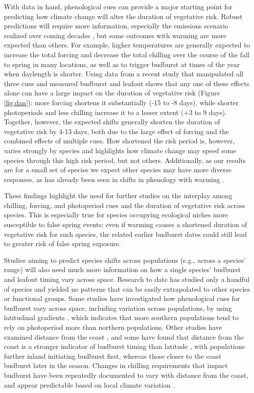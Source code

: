 \documentclass{article}\usepackage[]{graphicx}\usepackage[]{color}
\begin{document}
With data in hand, phenological cues can provide a major starting point for predicting how climate change will alter the duration of vegetative risk. Robust predictions will require more information, especially the emissions scenario realized over coming decades \citep{IPCC2014}, but some outcomes with warming are more expected than others. For example, higher temperatures are generally expected to increase the total forcing and decrease the total chilling over the course of the fall to spring in many locations, as well as to trigger budburst at times of the year when daylength is shorter. Using data from a recent study that manipulated all three cues and measured budburst and leafout \citep{Flynn2018} shows that any one of these effects alone can have a large impact on the duration of vegetative risk (Figure \ref{fig:dan}): more forcing shortens it substantially (-15 to -8 days), while shorter photoperiods and less chilling increase it to a lesser extent (+3 to 9 days). Together, however, the expected shifts generally shorten the duration of vegetative risk by 4-13 days, both due to the large effect of forcing and the combined effects of multiple cues. How shortened the risk period is, however, varies strongly by species and highlights how climate change may speed some species through this high risk period, but not others. Additionally, as our results are for a small set of species we expect other species may have more diverse responses, as has already been seen in shifts in phenology with warming \citep{Cleland2006, Fu2015, Xin2016}.

These findings highlight the need for further studies on the interplay among chilling, forcing, and photoperiod cues and the duration of vegetative risk across species. This is especially true for species occupying ecological niches more susceptible to false spring events; even if warming causes a shortened duration of vegetative risk for such species, the related earlier budburst dates could still lead to greater risk of false spring exposure.

Studies aiming to predict species shifts across populations (e.g., across a species' range) will also need much more information on how a single species' budburst and leafout timing vary across space. Research to date has studied only a handful of species and yielded no patterns that can be easily extrapolated to other species or functional groups. Some studies have investigated how phenological cues for budburst vary across space, including variation across populations, by using latitudinal gradients \citep{Gauzere2017, Sogaard2008, Way2015, Zohner2016}, which indicates that more southern populations tend to rely on photoperiod more than northern populations. Other studies have examined distance from the coast \citep[see][]{Aitken2015, Harrington2015, Myking2007}, and some have found that distance from the coast is a stronger indicator of budburst timing than latitude \citep{Myking2007}, with populations further inland initiating budburst first, whereas those closer to the coast budburst later in the season. Changes in chilling requirements that impact budburst have been repeatedly documented to vary with distance from the coast, and appear predictable based on local climate variation \citep{Campbell1979, Howe2003}.  
\end{document}
